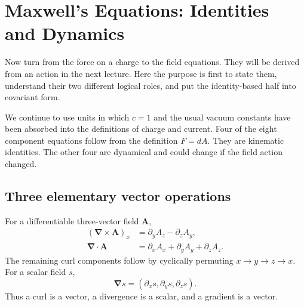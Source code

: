 \section{Maxwell's Equations: Identities and Dynamics}

Now turn from the force on a charge to the field equations.  They will be
derived from an action in the next lecture.  Here the purpose is first to
state them, understand their two different logical roles, and put the
identity-based half into covariant form.

\begin{classroomqa}
\end{classroomqa}

\begin{classroomqa}
\end{classroomqa}

We continue to use units in which \(c=1\) and the usual vacuum constants
have been absorbed into the definitions of charge and current.  Four of
the eight component equations follow from the definition
\(F=dA\).  They are kinematic identities.  The other four are dynamical and
could change if the field action changed.

\subsection{Three elementary vector operations}

For a differentiable three-vector field \(\mathbf A\),
\begin{align}
(\boldsymbol\nabla\times\mathbf A)_x
&=
\partial_yA_z-\partial_zA_y,
\\
\boldsymbol\nabla\cdot\mathbf A
&=
\partial_xA_x+\partial_yA_y+\partial_zA_z.
\end{align}
The remaining curl components follow by cyclically permuting
\(x\to y\to z\to x\).  For a scalar field \(s\),
\begin{equation}
\boldsymbol\nabla s
=
(\partial_xs,\partial_ys,\partial_zs).
\end{equation}
Thus a curl is a vector, a divergence is a scalar, and a gradient is a
vector.

